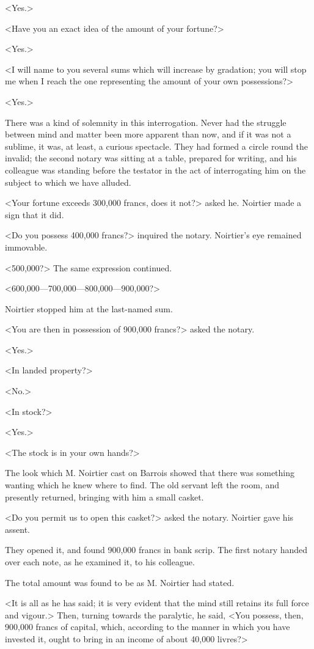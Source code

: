  <Yes.> 

 <Have you an exact idea of the amount of your fortune?> 

 <Yes.> 

 <I will name to you several sums which will increase by gradation; you will stop me when I reach the one representing the amount of your own possessions?> 

 <Yes.> 

 There was a kind of solemnity in this interrogation. Never had the struggle between mind and matter been more apparent than now, and if it was not a sublime, it was, at least, a curious spectacle. They had formed a circle round the invalid; the second notary was sitting at a table, prepared for writing, and his colleague was standing before the testator in the act of interrogating him on the subject to which we have alluded. 

 <Your fortune exceeds 300,000 francs, does it not?> asked he. Noirtier made a sign that it did. 

 <Do you possess 400,000 francs?> inquired the notary. Noirtier's eye remained immovable. 

 <500,000?> The same expression continued. 

 <600,000—700,000—800,000—900,000?> 

 Noirtier stopped him at the last-named sum. 

 <You are then in possession of 900,000 francs?> asked the notary. 

 <Yes.> 

 <In landed property?> 

 <No.> 

 <In stock?> 

 <Yes.> 

 <The stock is in your own hands?> 

 The look which M. Noirtier cast on Barrois showed that there was something wanting which he knew where to find. The old servant left the room, and presently returned, bringing with him a small casket. 

 <Do you permit us to open this casket?> asked the notary. Noirtier gave his assent. 

 They opened it, and found 900,000 francs in bank scrip. The first notary handed over each note, as he examined it, to his colleague. 

 The total amount was found to be as M. Noirtier had stated. 

 <It is all as he has said; it is very evident that the mind still retains its full force and vigour.> Then, turning towards the paralytic, he said, <You possess, then, 900,000 francs of capital, which, according to the manner in which you have invested it, ought to bring in an income of about 40,000 livres?> 

